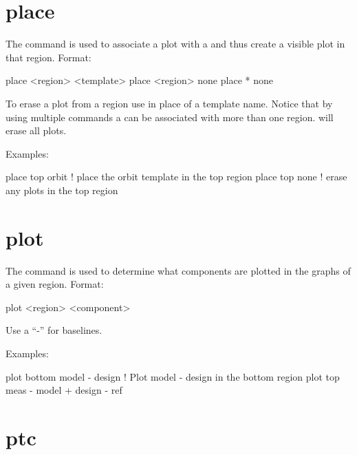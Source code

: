 \section{place}
\label{s:place}

The  command is used to associate a  plot
with a  and thus create a visible plot in that region. Format:
\begin{example}
  place <region> <template>
  place <region> none
  place * none
\end{example}

\vskip 0.2in 

To erase a plot from a region use  in place of a template
name. Notice that by using multiple  commands a
 can be associated with more than one region.
 will erase all plots.

Examples:
\begin{example}
  place top orbit  ! place the orbit template in the top region
  place top none   ! erase any plots in the top region
\end{example}

\section{plot}
\label{s:plot}

The  command is used to determine what components are plotted
in the graphs of a given region. Format:
\begin{example}
  plot <region> <component>
\end{example}

\vskip 0.2in 

Use a ``-'' for baselines. 

Examples:
\begin{example}
  plot bottom model - design       ! Plot model - design in the bottom region
  plot top meas - model + design - ref 
\end{example}

\section{ptc}
\label{s:ptc}

